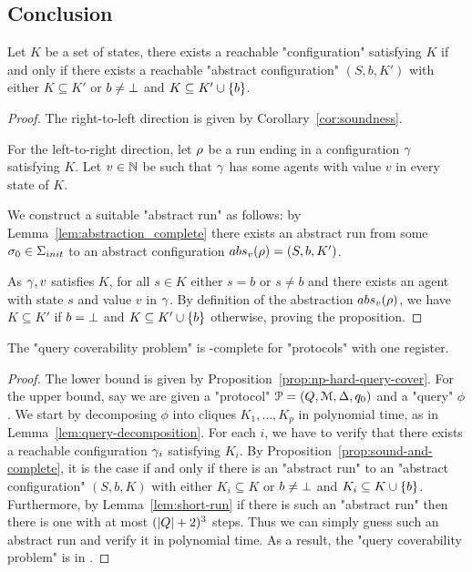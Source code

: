 \subsection{Conclusion}

\begin{proposition}
	\label{prop:sound-and-complete}
	Let $K$ be a set of states, there exists a reachable "configuration" satisfying $K$ if and only if there exists a reachable "abstract configuration" $(S,b,K')$ with either $K \subseteq K'$ or $b \neq \bot$ and $K \subseteq K' \cup \{b\}$.  
\end{proposition}

\begin{proof}
	The right-to-left direction is given by Corollary~\ref{cor:soundness}.
	
	For the left-to-right direction, let $\rho$ be a run ending in a configuration $\gamma$ satisfying $K$. Let $v \in \mathbb{N}$ be such that $\gamma$ has some agents with value $v$ in every state of $K$.
	
	We construct a suitable "abstract run" as follows: by Lemma~\ref{lem:abstraction_complete} there exists an abstract run from some $\sigma_0 \in \aconfiginitset$ to an abstract configuration $\absproj{v}{\run} = (S, b, K')$.
	
	As $\gamma, v$ satisfies $K$, for all $s \in K$ either $s = b$ or $s \neq b$ and there exists an agent with state $s$ and value $v$ in $\gamma$. 	
	By definition of the abstraction $\absproj{v}{\run}$, we have $K \subseteq K'$ if $b=\bot$ and $K \subseteq K' \cup \{b\}$ otherwise, proving the proposition.
\end{proof}


\begin{theorem}
	\label{thm:np-complete-query-cover}
	The "query coverability problem" is \NP-complete for "protocols" with one register.
\end{theorem}

\begin{proof}
	The lower bound is given by Proposition~\ref{prop:np-hard-query-cover}.
	For the upper bound, say we are given a "protocol" $\mathcal{P} = (Q, \mathcal{M}, \Delta, q_0)$ and a "query" $\phi$.
	We start by decomposing $\phi$ into cliques $K_1, \ldots, K_p$ in polynomial time, as in Lemma~\ref{lem:query-decomposition}.
	For each $i$, we have to verify that there exists a reachable configuration $\gamma_i$ satisfying $K_i$. By Proposition~\ref{prop:sound-and-complete}, it is the case if and only if there is an "abstract run" to an "abstract configuration" $(S,b, K)$ with either $K_i \subseteq K$ or $b\neq \bot$ and $K_i \subseteq K\cup\{b\}$.
	Furthermore, by Lemma~\ref{lem:short-run} if there is such an "abstract run" then there is one with at most $(|Q|+2)^3$ steps. 
	Thus we can simply guess such an abstract run and verify it in polynomial time.
	As a result, the "query coverability problem" is in \NP. 
\end{proof}
